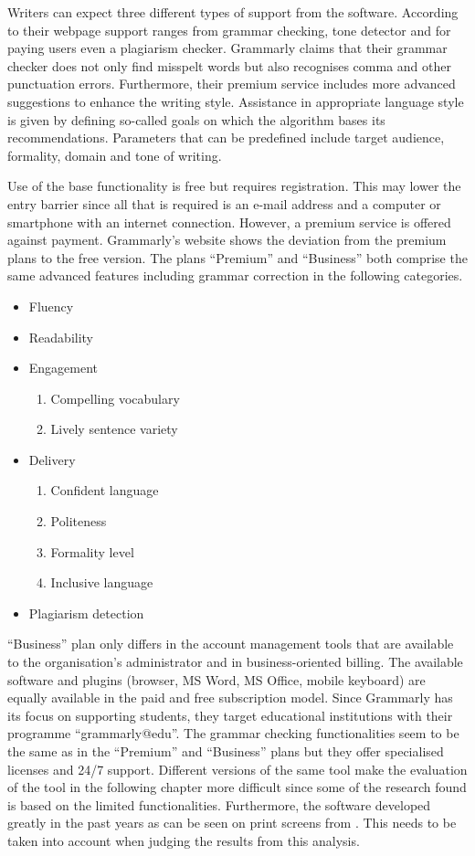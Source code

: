 \documentclass[runningheads]{llncs}
\let\OldTextregistered\textregistered
\renewcommand{\textregistered}{\OldTextregistered\xspace}
\begin{document}
Writers can expect three different types of support from the software. According to their webpage \parencite{noauthor_grammarly_nodate} support ranges from grammar checking, tone detector and for paying users even a plagiarism checker. Grammarly\textregistered claims that their grammar checker does not only find misspelt words but also recognises comma and other punctuation errors. Furthermore, their premium service includes more advanced suggestions to enhance the writing style. Assistance in appropriate language style is given by defining so-called goals on which the algorithm bases its recommendations. Parameters that can be predefined include target audience, formality, domain and tone of writing.   

Use of the base functionality is free but requires registration. This may lower the entry barrier since all that is required is an e-mail address and a computer or smartphone with an internet connection. However, a premium service is offered against payment. Grammarly\textregistered's website \citep{noauthor_grammarly_nodate} shows the deviation from the premium plans to the free version. The plans ``Premium'' and ``Business'' both comprise the same advanced features including grammar correction in the following categories.
\begin{itemize}
 \item Fluency
 \item Readability
 \item Engagement
 \begin{enumerate}
  \item Compelling vocabulary
  \item Lively sentence variety
 \end{enumerate}
 \item Delivery
 \begin{enumerate}
  \item Confident language
  \item Politeness
  \item Formality level
  \item Inclusive language
 \end{enumerate}
 \item Plagiarism detection
\end{itemize}
``Business'' plan only differs in the account management tools that are available to the organisation's administrator and in business-oriented billing. The available software and plugins (browser, MS Word, MS Office, mobile keyboard) are equally available in the paid and free subscription model. Since Grammarly\textregistered has its focus on supporting students, they target educational institutions with their programme ``grammarly@edu''. The grammar checking functionalities seem to be the same as in the ``Premium'' and ``Business'' plans but they offer specialised licenses and 24/7 support. Different versions of the same tool make the evaluation of the tool in the following chapter more difficult since some of the research found is based on the limited functionalities. Furthermore, the software developed greatly in the past years as can be seen on print screens from \textcite{dembsey_closing_2017}. This needs to be taken into account when judging the results from this analysis.
\end{document}
